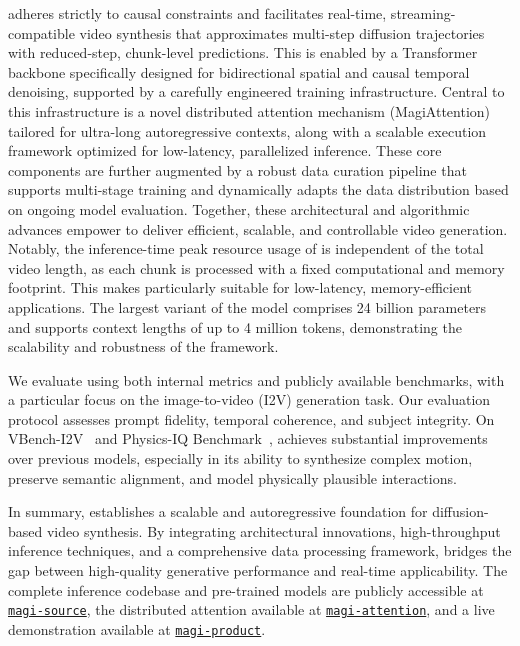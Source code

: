 \magi adheres strictly to causal constraints and facilitates real-time, streaming-compatible video synthesis that approximates multi-step diffusion trajectories with reduced-step, chunk-level predictions. This is enabled by a Transformer~\citep{transformer} backbone specifically designed for bidirectional spatial and causal temporal denoising, supported by a carefully engineered training infrastructure. Central to this infrastructure is a novel distributed attention mechanism (MagiAttention) tailored for ultra-long autoregressive contexts, along with a scalable execution framework optimized for low-latency, parallelized inference. These core components are further augmented by a robust data curation pipeline that supports multi-stage training and dynamically adapts the data distribution based on ongoing model evaluation. Together, these architectural and algorithmic advances empower \magi to deliver efficient, scalable, and controllable video generation. Notably, the inference-time peak resource usage of \magi is independent of the total video length, as each chunk is processed with a fixed computational and memory footprint. This makes \magi particularly suitable for low-latency, memory-efficient applications. The largest variant of the model comprises 24 billion parameters and supports context lengths of up to 4 million tokens, demonstrating the scalability and robustness of the framework.

We evaluate \magi using both internal metrics and publicly available benchmarks, with a particular focus on the image-to-video (I2V) generation task. Our evaluation protocol assesses prompt fidelity, temporal coherence, and subject integrity. On VBench-I2V~\citep{huang2024vbenchcomprehensiveversatilebenchmark} and Physics-IQ Benchmark~\citep{physicsiqbenchmark}, \magi achieves substantial improvements over previous models, especially in its ability to synthesize complex motion, preserve semantic alignment, and model physically plausible interactions.

In summary, \magi establishes a scalable and autoregressive foundation for diffusion-based video synthesis. By integrating architectural innovations, high-throughput inference techniques, and a comprehensive data processing framework, \magi bridges the gap between high-quality generative performance and real-time applicability. The complete inference codebase and pre-trained models are publicly accessible at \href{https://github.com/sandai-org/magi-1}{\texttt{magi-source}}, the distributed attention available at \href{https://github.com/sandai-org/magiattention}{\texttt{magi-attention}}, and a live demonstration available at \href{https://sand.ai}{\texttt{magi-product}}.



